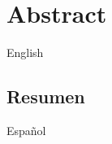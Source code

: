 \thispagestyle{plain}

\section*{Abstract}


English

\newpage 
\thispagestyle{plain}

\begin{otherlanguage}{spanish}

\section*{Resumen}

Español

\end{otherlanguage}